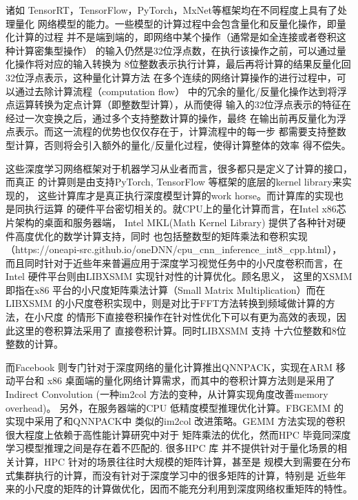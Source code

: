 诸如 TensorRT，TensorFlow，PyTorch，MxNet等框架均在不同程度上具有了处理量化
网络模型的能力。一些模型的计算过程中会包含量化和反量化操作，即量化计算的过程
并不是端到端的，即网络中某个操作（通常是如全连接或者卷积这种计算密集型操作）
的输入仍然是32位浮点数，在执行该操作之前，可以通过量化操作将对应的输入转换为
8位整数表示执行计算，最后再将计算的结果反量化回32位浮点表示，这种量化计算方法
在多个连续的网络计算操作的进行过程中，可以通过去除计算流程（computation flow）
中的冗余的量化/反量化操作达到将浮点运算转换为定点计算（即整数型计算），从而使得
输入的32位浮点表示的特征在经过一次变换之后，通过多个支持整数计算的操作，最终
在输出前再反量化为浮点表示。而这一流程的优势也仅仅存在于，计算流程中的每一步
都需要支持整数型计算，否则将会引入额外的量化/反量化过程，使得计算整体的效率
得不偿失。

这些深度学习网络框架对于机器学习从业者而言，很多都只是定义了计算的接口，而真正
的计算则是由支持PyTorch, TensorFlow 等框架的底层的kernel library来实现的，
这些计算库才是真正执行深度模型计算的work horse。而计算库的实现也是同执行运算
的硬件平台密切相关的。就CPU上的量化计算而言，在Intel x86芯片架构的桌面和服务器端，
Intel MKL(Math Kernel Library) 提供了各种针对硬件高度优化的数学计算支持，同时
也包括整数型的矩阵乘法和卷积实现（https://oneapi-src.github.io/oneDNN/cpu_cnn_inference_int8_cpp.html），
而且同时针对于近些年来普遍应用于深度学习视觉任务中的小尺度卷积而言，在Intel
硬件平台则由LIBXSMM\cite{Heinecke2016LIBXSMMAS} 实现针对性的计算优化。顾名思义，
这里的XSMM 即指在x86 平台的小尺度矩阵乘法计算（Small Matrix Multiplication）而在
LIBXSMM 的小尺度卷积实现中，则是对比于FFT方法转换到频域做计算的方法，在小尺度
的情形下直接卷积操作在针对性优化下可以有更为高效的表现，因此这里的卷积算法采用了
直接卷积计算。同时LIBXSMM 支持 十六位整数和8位整数的计算。

而Facebook 则专门针对于深度网络的量化计算推出QNNPACK，实现在ARM 移动平台和
x86 桌面端的量化网络计算需求，而其中的卷积计算方法则是采用了 Indirect Convolution
\cite{Dukhan2019TheIC}(一种im2col 方法的变种，从计算实现角度改善memory overhead)。
另外，在服务器端的CPU 低精度模型推理优化计算。FBGEMM 的实现中采用了和QNNPACK中
类似的im2col 改进策略。GEMM 方法实现的卷积很大程度上依赖于高性能计算研究中对于
矩阵乘法的优化，然而HPC 毕竟同深度学习模型推理之间是存在着不匹配的. 很多HPC 库
并不提供针对于量化场景的相关计算，HPC 针对的场景往往时大规模的矩阵计算，甚至是
规模大到需要在分布式集群执行的计算，而没有针对于深度学习中的很多矩阵的计算，特别是
近些年来的小尺度的矩阵的计算做优化，因而不能充分利用到深度网络权重矩阵的特性。

